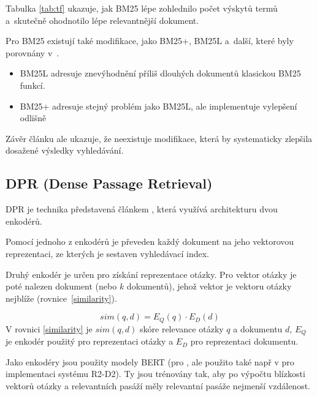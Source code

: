 Tabulka \ref{tab:tf} ukazuje, jak BM25 lépe zohlednilo počet výskytů termů a~skutečně ohodnotilo lépe relevantnější dokument.\par \medskip
Pro BM25 existují také modifikace, jako BM25+, BM25L a~další, které byly porovnány v~\cite{bm25_improvements}.\par
\begin{itemize}
    \item BM25L \cite{bm25_too_long} adresuje znevýhodnění příliš dlouhých dokumentů klasickou BM25 funkcí.
    \item BM25+ \cite{bm25_plus} adresuje stejný problém jako BM25L, ale implementuje vylepšení odlišně
\end{itemize}
Závěr článku \cite{bm25_improvements} ale ukazuje, že neexistuje modifikace, která by systematicky zlepšila dosažené výsledky vyhledávání.\par

\subsection{DPR (Dense Passage Retrieval)}
\label{dpr}
DPR je technika představená článkem \cite{dpr}, která využívá architekturu dvou enkodérů.\par
Pomocí jednoho z enkodérů je převeden každý dokument na jeho vektorovou reprezentaci, ze kterých je sestaven vyhledávací index.\par
Druhý enkodér je určen pro získání reprezentace otázky. Pro vektor otázky je poté nalezen dokument (nebo $k$ dokumentů), jehož vektor je vektoru otázky nejblíže (rovnice~\ref{similarity}).\par
\begin{equation}
    \label{similarity}
    sim(q,d) = E_Q(q)\cdot E_D(d)
\end{equation}
V rovnici \ref{similarity} \cite{dpr} je $sim(q,d)$ skóre relevance otázky $q$ a dokumentu $d$, $E_Q$ je enkodér použitý pro reprezentaci otázky a $E_D$ pro reprezentaci dokumentu.\par
Jako enkodéry jsou použity modely BERT (pro \cite{dpr}, ale použito také např v \cite{fajcik2021pruning} pro implementaci systému R2-D2). Ty jsou trénovány tak, aby po výpočtu blízkosti vektorů otázky a relevantních pasáží měly relevantní pasáže nejmenší vzdálenost.


